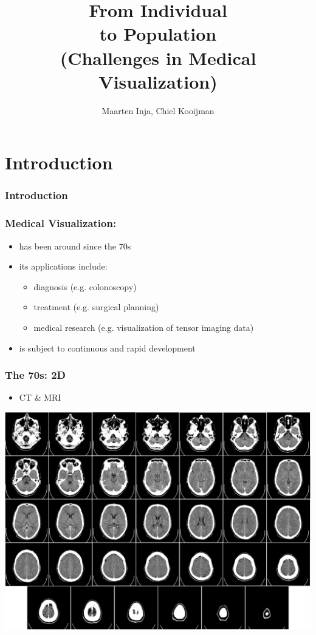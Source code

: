 \documentclass{beamer}
\title{From Individual\\to Population\\\Large (Challenges in Medical Visualization)}
\author{Maarten Inja, Chiel Kooijman}
\begin{document}
\begin{frame}
	\maketitle
\end{frame}



\section{Introduction}


\begin{frame}
	\frametitle{Introduction}
	\tableofcontents
\end{frame}


\begin{frame}
	\frametitle{Medical Visualization:}
	\begin{itemize}
		\item has been around since the 70s
		\item its applications include:
			\begin{itemize}
				\item diagnosis (e.g. colonoscopy)
				\item treatment (e.g. surgical planning)
				\item medical research (e.g. visualization of tensor imaging data)
			\end{itemize}
		\item is subject to continuous and rapid development
	\end{itemize}
\end{frame}

\begin{frame}
	\frametitle{The 70s: 2D}
	\begin{itemize}
		\item CT \& MRI
	\end{itemize}
	\begin{center}
		\includegraphics[width=.6\textwidth]{images/ct}
	\end{center}
\end{frame}
\end{document}
